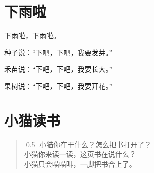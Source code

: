\documentclass[12pt,UTF-8,openany]{ctexbook}
\begin{document}
\hanzibox{}\hanzibox{}\hanzibox{}\hanzibox{}\hspace{1em}\hanzibox{}\hanzibox{}\hanzibox{}\hanzibox{}






\chapter{下雨啦}

\begin{large}
    
    下雨啦，下雨啦。
    
    种子说：“下吧，下吧，我要发芽。”
    
    禾苗说：“下吧，下吧，我要长大。”
    
    果树说：“下吧，下吧，我要开花。”
    
\end{large}


\clearpage

\begin{center}
    
\end{center}


\hanzibox{}\hanzibox{}\hanzibox{}\hanzibox{}\hspace{1em}\hanzibox{}\hanzibox{}\hanzibox{}\hanzibox{}

\hanzibox{}\hanzibox{}\hanzibox{}\hanzibox{}\hspace{1em}\hanzibox{}\hanzibox{}\hanzibox{}\hanzibox{}

\hanzibox{}\hanzibox{}\hanzibox{}\hanzibox{}\hspace{1em}\hanzibox{}\hanzibox{}\hanzibox{}\hanzibox{}

\hanzibox{}\hanzibox{}\hanzibox{}\hanzibox{}\hspace{1em}\hanzibox{}\hanzibox{}\hanzibox{}\hanzibox{}






\chapter{小猫读书}

\begin{large}
    
    \begin{verse}[0.5\linewidth]
        小猫你在干什么？怎么把书打开了？ \\
        小猫你来读一读，这页书在说什么？ \\
        小猫只会喵喵叫，一脚把书合上了。
    \end{verse}
    
\end{large}
\end{document}
